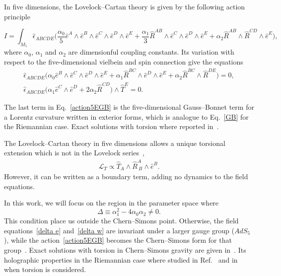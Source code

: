 \documentclass[aps,prd,12pt,superscriptaddress,showpacs,showkeys,longbibliography,reprint,nofootinbib]{revtex4-1}
\begin{document}
In five dimensions, the Lovelock--Cartan theory is given by the following action principle 
\begin{widetext}
  \begin{equation}
    \label{action5EGB}
    I = \int_{M_5} \hat{\epsilon}_{ABCDE} \Big(\frac{\alpha_0}{5}\hat{e}^A\wedge\hat{e}^B\wedge\hat{e}^C\wedge
    \hat{e}^D\wedge\hat{e}^E
    +\frac{\alpha_1}{3}\hat{R}^{AB}\wedge\hat{e}^C\wedge\hat{e}^D\wedge\hat{e}^E
    +\alpha_2\hat{R}^{AB}\wedge\hat{R}^{CD}
    \wedge\hat{e}^E\Big),
  \end{equation}
  where $\alpha_0$, $\alpha_1$ and $\alpha_2$ are dimensionful coupling constants. Its variation with respect to the five-dimensional vielbein and spin connection give the equations
  \begin{gather}
    \label{delta e}
    \hat{\epsilon}_{ABCDE}\Big(\alpha_0\hat{e}^B\wedge\hat{e}^C\wedge\hat{e}^D\wedge\hat{e}^E
    + \alpha_1\hat{R}^{BC}\wedge\hat{e}^D\wedge\hat{e}^E
    + \alpha_2\hat{R}^{BC}\wedge\hat{R}^{DE}\Big)=0,
    \\
    \label{delta w}
    \hat{\epsilon}_{ABCDE}\Big(\alpha_1\hat{e}^C\wedge\hat{e}^D+
    2\alpha_2\hat{R}^{CD}\Big)\wedge\hat{T}^E=0.
  \end{gather}
\end{widetext}

The last term in Eq.~\eqref{action5EGB} is the five-dimensional Gauss--Bonnet term for a Lorentz curvature written in exterior forms, which is analogue to Eq.~\eqref{GB} for the Riemannian case.
Exact solutions with torsion where reported in~\cite{Canfora:2007ux}.

The Lovelock--Cartan theory in five dimensions allows a unique torsional extension which is not in the Lovelock series~\cite{Mardones:1990qc},
\begin{align}
  \label{boundary}
  \mathcal{L}_{T} \propto \hat{T}_A\wedge \hat{R}^A_{\ B}\wedge\hat{e}^B.
\end{align}
However, it can be written as a boundary term, adding no dynamics to the field equations.

In this work, we will focus on the region in the parameter space where
\begin{equation}
  \label{delta}
  \Delta\equiv\alpha_1^2-4\alpha_0\alpha_2\neq 0.
\end{equation}
This condition place us outside the Chern--Simons point. Otherwise, the field equations~\eqref{delta e} and~\eqref{delta w} are invariant under a larger gauge group ($AdS_5$), while the action~\eqref{action5EGB} becomes the Chern--Simons form for that group~\cite{Zanelli:2016cs,*Troncoso:1999pk}. Exact solutions with torsion in Chern--Simons gravity are given in~\cite{Aros:2007nn,Banados:2003cz}. Its holographic properties in the Riemannian case where studied in Ref.~\cite{Banados:2005rz} and in \cite{Banados:2006fe} when torsion is considered. 
\end{document}
